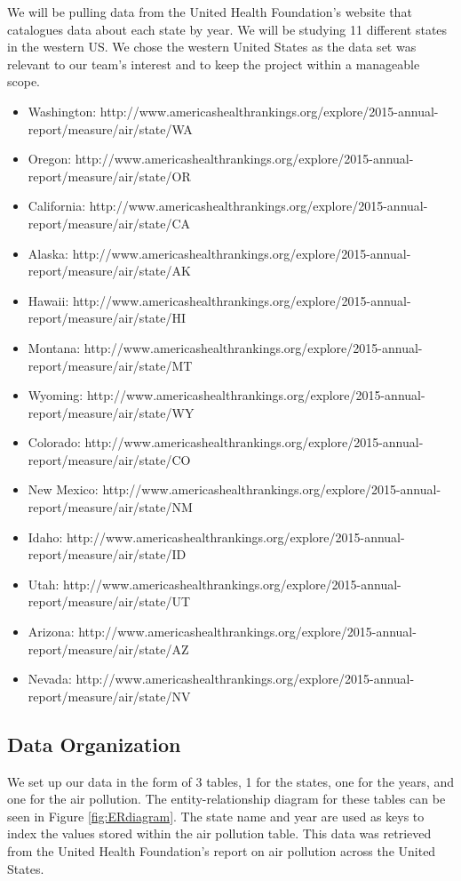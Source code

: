\documentclass[journal]{vgtc}                %
\begin{document}
We will be pulling data from the United Health Foundation’s website that catalogues data about each state by year. We 
will be studying 11 different states in the western US. We chose the western United States as the data set was 
relevant to our team's interest and to keep the project within a manageable scope.
\begin{itemize}
\item Washington: 
http://www.americashealthrankings.org/explore/2015-annual-report/measure/air/state/WA
\item Oregon: http://www.americashealthrankings.org/explore/2015-annual-report/measure/air/state/OR
\item California: http://www.americashealthrankings.org/explore/2015-annual-report/measure/air/state/CA
\item Alaska: http://www.americashealthrankings.org/explore/2015-annual-report/measure/air/state/AK 
\item Hawaii: http://www.americashealthrankings.org/explore/2015-annual-report/measure/air/state/HI
\item Montana: http://www.americashealthrankings.org/explore/2015-annual-report/measure/air/state/MT
\item Wyoming: http://www.americashealthrankings.org/explore/2015-annual-report/measure/air/state/WY
\item Colorado: http://www.americashealthrankings.org/explore/2015-annual-report/measure/air/state/CO
\item New Mexico: http://www.americashealthrankings.org/explore/2015-annual-report/measure/air/state/NM
\item Idaho: http://www.americashealthrankings.org/explore/2015-annual-report/measure/air/state/ID
\item Utah: http://www.americashealthrankings.org/explore/2015-annual-report/measure/air/state/UT
\item Arizona: http://www.americashealthrankings.org/explore/2015-annual-report/measure/air/state/AZ
\item Nevada: http://www.americashealthrankings.org/explore/2015-annual-report/measure/air/state/NV 
\end{itemize}


\subsection{Data Organization}

We set up our data in the form of 3 tables, 1 for the states, one for the years, and one for the air pollution. The 
entity-relationship diagram for these tables can be seen in Figure \ref{fig:ERdiagram}. 
The state name and year are used as keys to index the values stored within the air pollution table. This data was 
retrieved from the United Health Foundation's report on air pollution across the United States.
\end{document}
